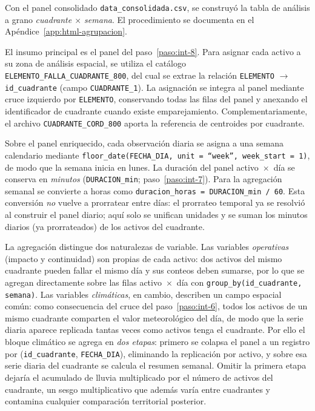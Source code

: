     Con el panel consolidado \texttt{data\_consolidada.csv}, se construyó la tabla de análisis a grano \textit{cuadrante $\times$ semana}. El procedimiento se documenta en el Apéndice~\ref{app:html-agrupacion}.
    
    El insumo principal es el panel del paso~\ref{paso:int-8}. Para asignar cada activo a su zona de análisis espacial, se utiliza el catálogo \texttt{ELEMENTO\_FALLA\_CUADRANTE\_800}, del cual se extrae la relación \texttt{ELEMENTO} $\rightarrow$ \texttt{id\_cuadrante} (campo \texttt{CUADRANTE\_1}). La asignación se integra al panel mediante cruce izquierdo por \texttt{ELEMENTO}, conservando todas las filas del panel y anexando el identificador de cuadrante cuando existe emparejamiento. Complementariamente, el archivo \texttt{CUADRANTE\_CORD\_800} aporta la referencia de centroides por cuadrante.
    
    Sobre el panel enriquecido, cada observación diaria se asigna a una semana calendario mediante \texttt{floor\_date(FECHA\_DIA, unit = ``week'', week\_start = 1)}, de modo que la semana inicia en lunes. La duración del panel activo~$\times$~día se conserva en \textit{minutos} (\texttt{DURACION\_min}; paso~\ref{paso:int-7}). Para la agregación semanal se convierte a horas como \texttt{duracion\_horas = DURACION\_min / 60}. Esta conversión \textit{no} vuelve a prorratear entre días: el prorrateo temporal ya se resolvió al construir el panel diario; aquí solo se unifican unidades y se suman los minutos diarios (ya prorrateados) de los activos del cuadrante.
    
    La agregación distingue dos naturalezas de variable. Las variables \textit{operativas} (impacto y continuidad) son propias de cada activo: dos activos del mismo cuadrante pueden fallar el mismo día y sus conteos deben sumarse, por lo que se agregan directamente sobre las filas activo~$\times$~día con \texttt{group\_by(id\_cuadrante, semana)}. Las variables \textit{climáticas}, en cambio, describen un campo espacial común: como consecuencia del cruce del paso~\ref{paso:int-6}, todos los activos de un mismo cuadrante comparten el valor meteorológico del día, de modo que la serie diaria aparece replicada tantas veces como activos tenga el cuadrante. Por ello el bloque climático se agrega en \textit{dos etapas}: primero se colapsa el panel a un registro por (\texttt{id\_cuadrante}, \texttt{FECHA\_DIA}), eliminando la replicación por activo, y sobre esa serie diaria del cuadrante se calcula el resumen semanal. Omitir la primera etapa dejaría el acumulado de lluvia multiplicado por el número de activos del cuadrante, un sesgo multiplicativo que además varía entre cuadrantes y contamina cualquier comparación territorial posterior.

